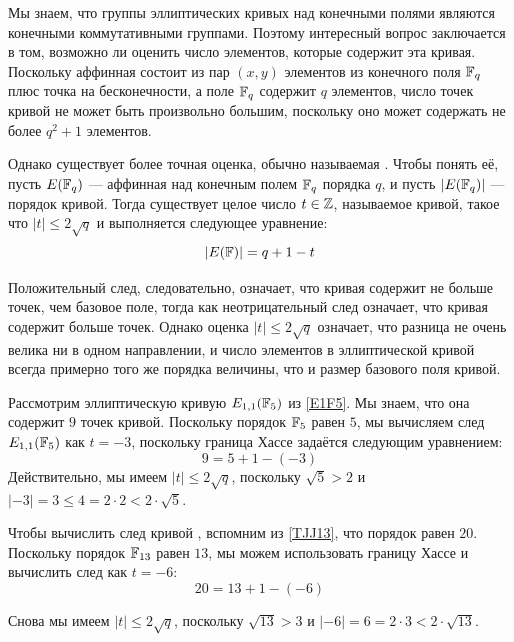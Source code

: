 Мы знаем, что группы эллиптических кривых над конечными полями являются конечными коммутативными группами. Поэтому интересный вопрос заключается в том, возможно ли оценить число элементов, которые содержит эта кривая. Поскольку аффинная  состоит из пар $(x,y)$ элементов из конечного поля $\mathbb{F}_q$ плюс точка на бесконечности, а поле $\mathbb{F}_q$ содержит $q$ элементов, число точек кривой не может быть произвольно большим, поскольку оно может содержать не более $q^2+1$ элементов. 

Однако существует более точная оценка, обычно называемая . Чтобы понять её, пусть $E(\mathbb{F}_q)$ — аффинная  над конечным полем $\mathbb{F}_q$ порядка $q$, и пусть $|E(\mathbb{F}_q)|$ — порядок кривой. Тогда существует целое число $t\in \mathbb{Z}$, называемое  кривой, такое что $|t| \leq 2\sqrt{q}$ и выполняется следующее уравнение:
\begin{equation}\label{hasse-bound}
|E(\mathbb{F})| = q +1 -t
\end{equation}

Положительный след, следовательно, означает, что кривая содержит не больше точек, чем базовое поле, тогда как неотрицательный след означает, что кривая содержит больше точек. Однако оценка $|t| \leq 2\sqrt{q}$ означает, что разница не очень велика ни в одном направлении, и число элементов в эллиптической кривой всегда примерно того же порядка величины, что и размер базового поля кривой.

\begin{example}\label{ex:E1F5-frobenius} Рассмотрим эллиптическую кривую $E_{1,1}(\mathbb{F}_5)$ из \examplename{} \ref{E1F5}. Мы знаем, что она содержит $9$ точек кривой. Поскольку порядок $\mathbb{F}_5$ равен $5$, мы вычисляем след $E_{1,1}(\mathbb{F}_5)$ как $t=-3$, поскольку граница Хассе задаётся следующим уравнением:
$$
9 = 5 + 1 - (-3)
$$
Действительно, мы имеем $|t| \leq 2\sqrt{q}$, поскольку $\sqrt{5}> 2$ и 
$|-3|= 3 \leq 4 = 2\cdot 2< 2\cdot \sqrt{5}$.
\end{example}

\begin{example}\label{ex:TJJ13-frobenius} Чтобы вычислить след кривой , вспомним из \examplename{} \ref{TJJ13}, что порядок \TJJ{} равен $20$. Поскольку порядок $\mathbb{F}_{13}$ равен $13$, мы можем использовать границу Хассе и вычислить след как $t=-6$:
\begin{equation}
20 = 13 + 1 - (-6)
\end{equation}

Снова мы имеем $|t| \leq 2\sqrt{q}$, поскольку $\sqrt{13}> 3$ и 
$|-6|= 6 = 2\cdot 3< 2\cdot \sqrt{13}$.
\end{example}

